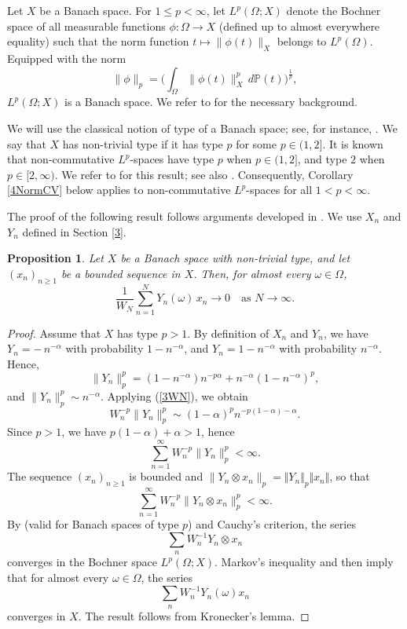 \documentclass[12pt]{amsart}
\newcommand{\Pdb}{\mbox{$\mathbb{P}$}}
\newcommand{\norm}[1]{\Vert#1\Vert}
\newtheorem{proposition}[theorem]{Proposition}
\theoremstyle{remark}
\theoremstyle{definition}
\numberwithin{equation}{section}
\begin{document}
Let $X$ be a Banach space.  
For $1 \le p < \infty$, let $L^p(\Omega; X)$ denote the Bochner space of all measurable functions $\phi \colon \Omega \to X$ (defined up to almost everywhere equality) such that the norm function
$t \mapsto \|\phi(t)\|_X$ belongs to $L^p(\Omega)$.  
Equipped with the norm
$$
\|\phi\|_p = \Biggl( \int_{\Omega} \|\phi(t)\|_X^p \, d\Pdb(t) \Biggr)^{\frac{1}{p}},
$$
$L^p(\Omega; X)$ is a Banach space. We refer to \cite[Chapters I--IV]{DU} for the necessary background. 

We will use the classical notion of type of a Banach space; see, for instance, \cite{Maurey}. 
We say that $X$ has non-trivial type if it has type $p$ for some $p \in (1,2]$. 
It is known that non-commutative $L^p$-spaces have type $p$ when $p \in (1,2]$, and type $2$ 
when $p \in [2,\infty)$. We refer to \cite{Fack} for this result; see also 
\cite[Corollary 5.5]{PX}. 
Consequently, Corollary \ref{4NormCV} below applies to non-commutative 
$L^p$-spaces for all $1 < p < \infty$.


The proof of the following result follows arguments developed in \cite[Section 2]{HJP}.
We use $X_n$ and $Y_n$ defined in Section \ref{3}.

\begin{proposition}\label{4Automatic}
Let $X$ be a Banach space with non-trivial type, and let $(x_n)_{n\geq 1}$ be a bounded sequence in $X$. 
Then, for almost every $\omega \in \Omega$,
$$
\frac{1}{W_N} \sum_{n=1}^N Y_n(\omega)\, x_n \longrightarrow 0 \quad \text{as } N \to \infty.
$$
\end{proposition}

\begin{proof}
Assume that $X$ has type $p>1$. By definition of $X_n$ and $Y_n$, we have $Y_n = -\, n^{-\alpha}$ with probability $1-n^{-\alpha}$, and $Y_n = 1-n^{-\alpha}$ with probability $n^{-\alpha}$. Hence,
$$
\|Y_n\|_p^p = (1-n^{-\alpha}) n^{-p\alpha} + n^{-\alpha} (1-n^{-\alpha})^p,
$$
and 
$\|Y_n\|_p^p \sim n^{-\alpha}.$
Applying (\ref{3WN}), we obtain
$$
W_n^{-p} \|Y_n\|_p^p \sim (1-\alpha)^p n^{-p(1-\alpha)-\alpha}.
$$
Since $p>1$, we have $p(1-\alpha) + \alpha > 1$, hence
$$
\sum_{n=1}^\infty W_n^{-p} \|Y_n\|_p^p < \infty.
$$
The sequence $(x_n)_{n\geq 1}$ is bounded and $\|Y_n \otimes x_n\|_p=
\norm{Y_n}_p\norm{x_n}$, so that
$$
\sum_{n=1}^\infty W_n^{-p} \|Y_n \otimes x_n\|_p^p < \infty.
$$
By \cite[(2.1.2)]{HJP} (valid for Banach spaces of type $p$) and Cauchy's criterion, the series
$$
\sum_n W_n^{-1} Y_n \otimes x_n
$$
converges in the Bochner space $L^p(\Omega; X)$. Markov's inequality and \cite[Lemma 1.2]{HJP} then imply that for almost every $\omega \in \Omega$, the series
$$
\sum_n W_n^{-1} Y_n(\omega) x_n
$$
converges in $X$. The result follows from Kronecker's lemma.
\end{proof}
\end{document}
